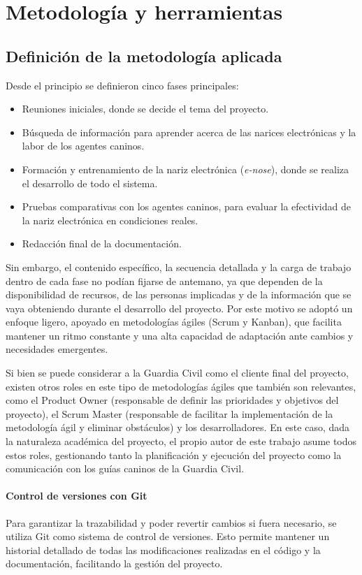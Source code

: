 \chapter{Metodología y herramientas}
\section{Definición de la metodología aplicada}

Desde el principio se definieron cinco fases principales:

\begin{itemize}
    \item Reuniones iniciales, donde se decide el tema del proyecto.
    \item Búsqueda de información para aprender acerca de las narices electrónicas y la labor de los agentes caninos.
    \item Formación y entrenamiento de la nariz electrónica (\textit{e-nose}), donde se realiza el desarrollo de todo el sistema.
    \item Pruebas comparativas con los agentes caninos, para evaluar la efectividad de la nariz electrónica en condiciones reales.
    \item Redacción final de la documentación.
\end{itemize}

Sin embargo, el contenido específico, la secuencia detallada y la carga de trabajo dentro de cada fase no podían fijarse de antemano, ya que dependen de la disponibilidad de recursos, de las personas implicadas y de la información que se vaya obteniendo durante el desarrollo del proyecto. Por este motivo se adoptó un enfoque ligero, apoyado en metodologías ágiles (Scrum y Kanban), que facilita mantener un ritmo constante y una alta capacidad de adaptación ante cambios y necesidades emergentes.

Si bien se puede considerar a la Guardia Civil como el cliente final del proyecto, existen otros roles en este tipo de metodologías ágiles que también son relevantes, como el Product Owner (responsable de definir las prioridades y objetivos del proyecto), el Scrum Master (responsable de facilitar la implementación de la metodología ágil y eliminar obstáculos) y los desarrolladores. En este caso, dada la naturaleza académica del proyecto, el propio autor de este trabajo asume todos estos roles, gestionando tanto la planificación y ejecución del proyecto como la comunicación con los guías caninos de la Guardia Civil.

\subsubsection{Control de versiones con Git}
Para garantizar la trazabilidad y poder revertir cambios si fuera necesario, se utiliza Git como sistema de control de versiones. Esto permite mantener un historial detallado de todas las modificaciones realizadas en el código y la documentación, facilitando la gestión del proyecto.
\par

